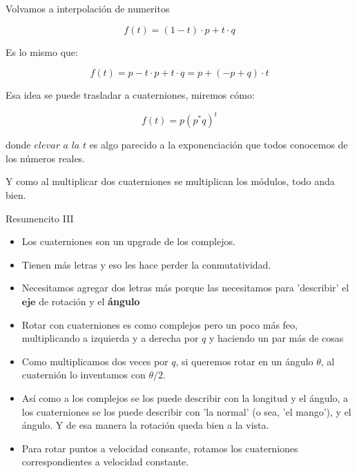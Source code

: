 \documentclass[10pt]{beamer}
\begin{document}
\begin{frame}{Volvamos a interpolación de numeritos}

$$f(t) = (1-t) \cdot p + t \cdot q$$

Es lo mismo que:

$$f(t) = p-t\cdot p + t\cdot q = p + (-p+q) \cdot t$$ \pause

Esa idea se puede trasladar a cuaterniones, miremos cómo:

$$f(t)= p (p^*q)^t$$ \pause

donde $\textit{elevar a la $t$}$ es algo parecido a la exponenciación que todos conocemos de los números reales. \pause

Y como al multiplicar dos cuaterniones se multiplican los módulos, todo anda bien.

\end{frame}

\begin{frame}{Resumencito III}

\begin{itemize}
    \item Los cuaterniones son un upgrade de los complejos.
    \item Tienen más letras y eso les hace perder la conmutatividad.
    \item Necesitamos agregar dos letras más porque las necesitamos para 'describir' el $\textbf{eje}$ de rotación y el \textbf{ángulo}
    \item Rotar con cuaterniones es como complejos pero un poco más feo, multiplicando a izquierda y a derecha por $q$ y haciendo un par más de cosas
    \item Como multiplicamos dos veces por $q$, si queremos rotar en un ángulo $\theta$, al cuaternión lo inventamos con $\theta/2$.
    \item Así como a los complejos se los puede describir con la longitud y el ángulo, a los cuaterniones se los puede describir con 'la normal' (o sea, 'el mango'), y el ángulo. Y de esa manera la rotación queda bien a la vista.
    \item Para rotar puntos a velocidad consante, rotamos los cuaterniones correspondientes a velocidad constante.
    
\end{itemize}
    
\end{frame}
\end{document}
